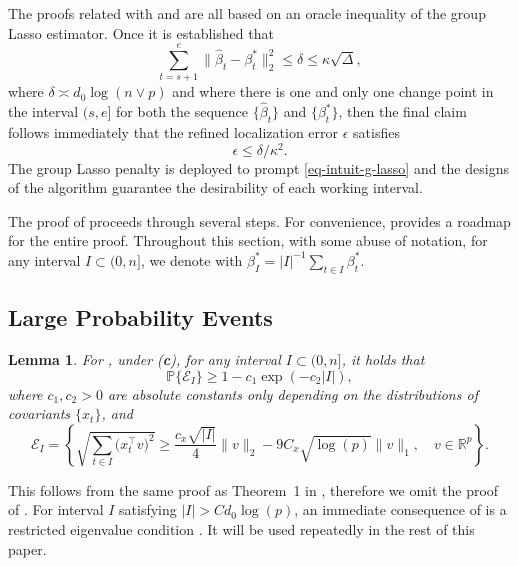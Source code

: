\documentclass[twoside]{article}
\newtheorem{lemma}[theorem]{Lemma}
\begin{document}
The proofs related with  and  are all based on an oracle inequality of the group Lasso estimator.  Once it is established that
	\begin{equation}\label{eq-intuit-g-lasso}
		\sum_{t = s + 1}^e \|\widehat{\beta}_t - \beta^*_t\|_2^2 \leq \delta \leq \kappa \sqrt{\Delta},
	\end{equation}
	where $\delta \asymp d_0 \log(n \vee p)$ and where there is one and only one change point in the interval $(s, e]$ for both the sequence $\{\widehat{\beta}_t\}$ and $\{\beta^*_t\}$, then the final claim follows immediately that the refined localization error $\epsilon$ satisfies
	\[
		\epsilon \leq \delta/\kappa^2.
	\]
	The group Lasso penalty is deployed to prompt \eqref{eq-intuit-g-lasso} and the designs of the algorithm guarantee the desirability of each working interval.

The proof of  proceeds through several steps. For convenience,   provides a roadmap for the entire proof. Throughout this section, with some abuse of notation, for any interval $I \subset (0, n]$, we denote with $\beta^*_I = |I|^{-1}\sum_{t \in I} \beta^*_t$.

\begin{figure}[omitted: a diagram of this paper's results, not reproduced here]\label{fig-rm}\end{figure}
 
\subsection{Large Probability Events}

\begin{lemma}\label{lem-RE}
For , under (\textbf{c}), for any interval $I \subset (0, n]$, it holds that
	\[
		\mathbb{P}\{\mathcal{E}_I\} \geq 1 - c_1 \exp(-c_2 |I|),
	\]
	where $c_1, c_2 > 0$ are absolute constants only depending on the distributions of covariants $\{x_t\}$, and
	\[
		\mathcal{E}_I = \left\{\sqrt{\sum_{t \in I} \bigl(x_t^{\top}v\bigr)^2} \geq \frac{c_x\sqrt{ |I|}}{4} \|v\|_2 - 9 C_x \sqrt{\log(p)}\|v\|_1, \quad v \in \mathbb{R}^p \right\}.
	\]
\end{lemma}

This follows from the same proof as Theorem~1 in \cite{raskutti2010restricted}, therefore we omit the proof of .  For interval $I$ satisfying $|I| > C d_0\log(p)$, an immediate consequence of  is a restricted eigenvalue condition \citep[e.g.][]{van2009conditions, bickel2009simultaneous}.  It will be used repeatedly in the rest of this paper.
\end{document}
